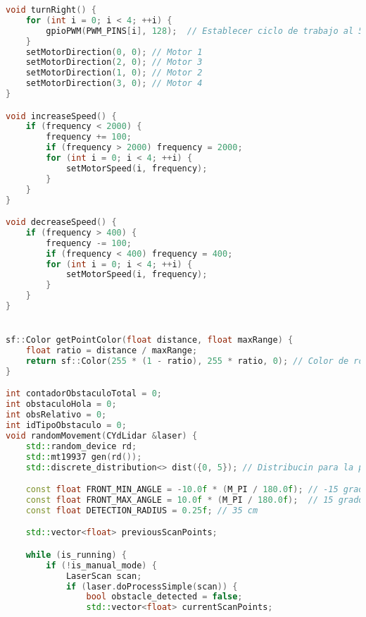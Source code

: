 \begin{lstlisting}[language={C++}, caption={Tercer ajuste de c\'odigo}, label={TercerAjuste}]
void turnRight() {
    for (int i = 0; i < 4; ++i) {
        gpioPWM(PWM_PINS[i], 128);  // Establecer ciclo de trabajo al 50%
    }
    setMotorDirection(0, 0); // Motor 1
    setMotorDirection(2, 0); // Motor 3
    setMotorDirection(1, 0); // Motor 2
    setMotorDirection(3, 0); // Motor 4
}

void increaseSpeed() {
    if (frequency < 2000) {
        frequency += 100;
        if (frequency > 2000) frequency = 2000;
        for (int i = 0; i < 4; ++i) {
            setMotorSpeed(i, frequency);
        }
    }
}

void decreaseSpeed() {
    if (frequency > 400) {
        frequency -= 100;
        if (frequency < 400) frequency = 400;
        for (int i = 0; i < 4; ++i) {
            setMotorSpeed(i, frequency);
        }
    }
}


sf::Color getPointColor(float distance, float maxRange) {
    float ratio = distance / maxRange;
    return sf::Color(255 * (1 - ratio), 255 * ratio, 0); // Color de rojo a verde
}

int contadorObstaculoTotal = 0;
int obstaculoHola = 0;
int obsRelativo = 0;
int idTipoObstaculo = 0;
void randomMovement(CYdLidar &laser) {
    std::random_device rd;
    std::mt19937 gen(rd());
    std::discrete_distribution<> dist({0, 5}); // Distribucin para la probabilidad de movimiento

    const float FRONT_MIN_ANGLE = -10.0f * (M_PI / 180.0f); // -15 grados en radaianes
    const float FRONT_MAX_ANGLE = 10.0f * (M_PI / 180.0f);  // 15 grados en radianes
    const float DETECTION_RADIUS = 0.25f; // 35 cm

    std::vector<float> previousScanPoints;

    while (is_running) {
        if (!is_manual_mode) {
            LaserScan scan;
            if (laser.doProcessSimple(scan)) {
                bool obstacle_detected = false;
                std::vector<float> currentScanPoints;
                

\end{lstlisting}
